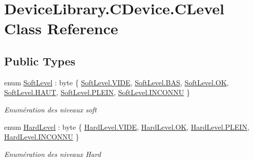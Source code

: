 \hypertarget{class_device_library_1_1_c_device_1_1_c_level}{}\section{Device\+Library.\+C\+Device.\+C\+Level Class Reference}
\label{class_device_library_1_1_c_device_1_1_c_level}


 


\subsection*{Public Types}
\begin{DoxyCompactItemize}
\item 
enum \mbox{\hyperlink{class_device_library_1_1_c_device_1_1_c_level_a83c2976bc299331f1c355e806299bb1f}{Soft\+Level}} \+: byte \{ \newline
\mbox{\hyperlink{class_device_library_1_1_c_device_1_1_c_level_a83c2976bc299331f1c355e806299bb1fa4c67bb3d8f85b3a1570dd8a5a8a26338}{Soft\+Level.\+V\+I\+DE}}, 
\mbox{\hyperlink{class_device_library_1_1_c_device_1_1_c_level_a83c2976bc299331f1c355e806299bb1fa366115ee6f4bf971e887e0fa4cd7d235}{Soft\+Level.\+B\+AS}}, 
\mbox{\hyperlink{class_device_library_1_1_c_device_1_1_c_level_a83c2976bc299331f1c355e806299bb1fae0aa021e21dddbd6d8cecec71e9cf564}{Soft\+Level.\+OK}}, 
\mbox{\hyperlink{class_device_library_1_1_c_device_1_1_c_level_a83c2976bc299331f1c355e806299bb1fa3e446a07216685e75b27a788840b51f5}{Soft\+Level.\+H\+A\+UT}}, 
\newline
\mbox{\hyperlink{class_device_library_1_1_c_device_1_1_c_level_a83c2976bc299331f1c355e806299bb1fa7ec21e24df39ba83c2d56f47d4932957}{Soft\+Level.\+P\+L\+E\+IN}}, 
\mbox{\hyperlink{class_device_library_1_1_c_device_1_1_c_level_a83c2976bc299331f1c355e806299bb1fab741d43a8209dcfcf03bb781061689a8}{Soft\+Level.\+I\+N\+C\+O\+N\+NU}}
 \}
\begin{DoxyCompactList}\small\item\em Enumération des niveaux soft \end{DoxyCompactList}\item 
enum \mbox{\hyperlink{class_device_library_1_1_c_device_1_1_c_level_a3f3169da53d5beebdac25e401982101a}{Hard\+Level}} \+: byte \{ \mbox{\hyperlink{class_device_library_1_1_c_device_1_1_c_level_a3f3169da53d5beebdac25e401982101aa4c67bb3d8f85b3a1570dd8a5a8a26338}{Hard\+Level.\+V\+I\+DE}}, 
\mbox{\hyperlink{class_device_library_1_1_c_device_1_1_c_level_a3f3169da53d5beebdac25e401982101aae0aa021e21dddbd6d8cecec71e9cf564}{Hard\+Level.\+OK}}, 
\mbox{\hyperlink{class_device_library_1_1_c_device_1_1_c_level_a3f3169da53d5beebdac25e401982101aa7ec21e24df39ba83c2d56f47d4932957}{Hard\+Level.\+P\+L\+E\+IN}}, 
\mbox{\hyperlink{class_device_library_1_1_c_device_1_1_c_level_a3f3169da53d5beebdac25e401982101aab741d43a8209dcfcf03bb781061689a8}{Hard\+Level.\+I\+N\+C\+O\+N\+NU}}
 \}
\begin{DoxyCompactList}\small\item\em Enumération des niveaux Hard \end{DoxyCompactList}\end{DoxyCompactItemize}
